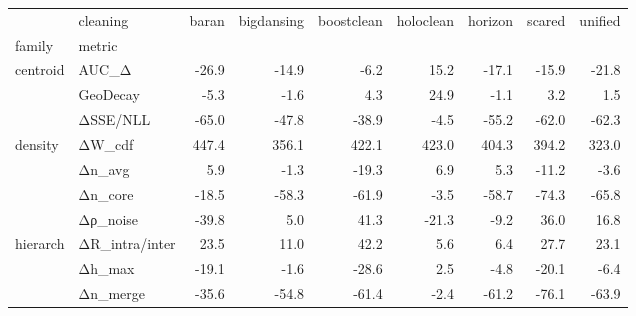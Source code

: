 \begin{tabular}{@{}llrrrrrrr@{}}
\toprule
 & cleaning & baran & bigdansing & boostclean & holoclean & horizon & scared & unified \\
family & metric &  &  &  &  &  &  &  \\
\midrule
\multirow[t]{3}{*}{centroid} & AUC_Δ & -26.9 & -14.9 & -6.2 & 15.2 & -17.1 & -15.9 & -21.8 \\
 & GeoDecay & -5.3 & -1.6 & 4.3 & 24.9 & -1.1 & 3.2 & 1.5 \\
 & ΔSSE/NLL & -65.0 & -47.8 & -38.9 & -4.5 & -55.2 & -62.0 & -62.3 \\
\cline{1-9}
\multirow[t]{4}{*}{density} & ΔW_cdf & 447.4 & 356.1 & 422.1 & 423.0 & 404.3 & 394.2 & 323.0 \\
 & Δn_avg & 5.9 & -1.3 & -19.3 & 6.9 & 5.3 & -11.2 & -3.6 \\
 & Δn_core & -18.5 & -58.3 & -61.9 & -3.5 & -58.7 & -74.3 & -65.8 \\
 & Δρ_noise & -39.8 & 5.0 & 41.3 & -21.3 & -9.2 & 36.0 & 16.8 \\
\cline{1-9}
\multirow[t]{3}{*}{hierarch} & ΔR_intra/inter & 23.5 & 11.0 & 42.2 & 5.6 & 6.4 & 27.7 & 23.1 \\
 & Δh_max & -19.1 & -1.6 & -28.6 & 2.5 & -4.8 & -20.1 & -6.4 \\
 & Δn_merge & -35.6 & -54.8 & -61.4 & -2.4 & -61.2 & -76.1 & -63.9 \\
\cline{1-9}
\bottomrule
\end{tabular}
